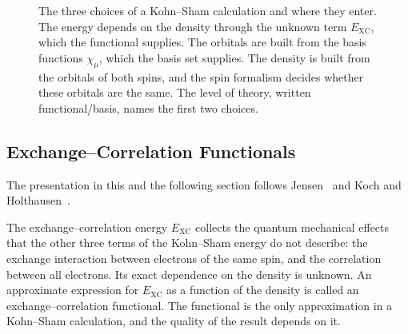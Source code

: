 \begin{figure}[h]
{%
}
\caption{The three choices of a Kohn--Sham calculation and where they enter.
The energy depends on the density through the unknown term $E_\text{XC}$,
which the functional supplies. The orbitals are built from the basis
functions $\chi_\mu$, which the basis set supplies. The density is built
from the orbitals of both spins, and the spin formalism decides whether
these orbitals are the same. The level of theory, written functional/basis,
names the first two choices.}
\label{fig:choices}
\end{figure}

\subsection{Exchange--Correlation Functionals}
\label{sec:background-functionals}

The presentation in this and the following section follows
Jensen~\cite{jensen2017} and Koch and Holthausen~\cite{koch2001}.

The exchange--correlation energy $E_\text{XC}$ collects the quantum
mechanical effects that the other three terms of the Kohn--Sham energy do
not describe: the exchange interaction between electrons of the same spin,
and the correlation between all electrons. Its exact dependence on the
density is unknown. An approximate expression for $E_\text{XC}$ as a
function of the density is called an exchange--correlation functional. The
functional is the only approximation in a Kohn--Sham calculation, and the
quality of the result depends on it.

